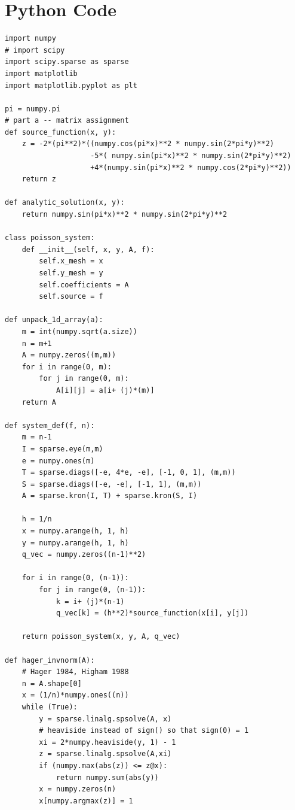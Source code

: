 \documentclass{template}
\begin{document}
\clearpage




\appendix

\section{Python Code}\label{sec:code}

\begin{verbatim}
import numpy
# import scipy
import scipy.sparse as sparse
import matplotlib
import matplotlib.pyplot as plt

pi = numpy.pi
# part a -- matrix assignment
def source_function(x, y):
    z = -2*(pi**2)*((numpy.cos(pi*x)**2 * numpy.sin(2*pi*y)**2) 
                    -5*( numpy.sin(pi*x)**2 * numpy.sin(2*pi*y)**2) 
                    +4*(numpy.sin(pi*x)**2 * numpy.cos(2*pi*y)**2))
    return z

def analytic_solution(x, y):
    return numpy.sin(pi*x)**2 * numpy.sin(2*pi*y)**2
    
class poisson_system:
    def __init__(self, x, y, A, f):
        self.x_mesh = x
        self.y_mesh = y
        self.coefficients = A
        self.source = f

def unpack_1d_array(a):
    m = int(numpy.sqrt(a.size))
    n = m+1
    A = numpy.zeros((m,m))
    for i in range(0, m):
        for j in range(0, m):
            A[i][j] = a[i+ (j)*(m)]
    return A

def system_def(f, n):
    m = n-1
    I = sparse.eye(m,m)
    e = numpy.ones(m)
    T = sparse.diags([-e, 4*e, -e], [-1, 0, 1], (m,m))
    S = sparse.diags([-e, -e], [-1, 1], (m,m))
    A = sparse.kron(I, T) + sparse.kron(S, I)
    
    h = 1/n
    x = numpy.arange(h, 1, h)
    y = numpy.arange(h, 1, h)
    q_vec = numpy.zeros((n-1)**2)

    for i in range(0, (n-1)):
        for j in range(0, (n-1)):
            k = i+ (j)*(n-1)
            q_vec[k] = (h**2)*source_function(x[i], y[j])

    return poisson_system(x, y, A, q_vec)

def hager_invnorm(A):
    # Hager 1984, Higham 1988
    n = A.shape[0]
    x = (1/n)*numpy.ones((n))
    while (True):
        y = sparse.linalg.spsolve(A, x)
        # heaviside instead of sign() so that sign(0) = 1
        xi = 2*numpy.heaviside(y, 1) - 1 
        z = sparse.linalg.spsolve(A,xi)
        if (numpy.max(abs(z)) <= z@x):
            return numpy.sum(abs(y))
        x = numpy.zeros(n)
        x[numpy.argmax(z)] = 1



\end{verbatim}
\end{document}
